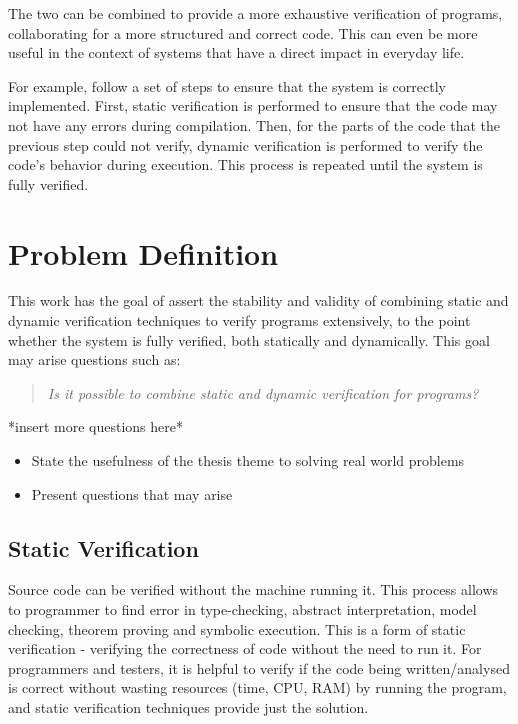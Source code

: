 The two can  be combined to provide a more exhaustive verification of \ocaml programs, 
collaborating for a more structured and correct code. This can even be more useful in the context of 
systems that have a direct impact in everyday life.

For example, \monitors follow a set of steps to ensure that the system is correctly implemented. 
First, static verification is performed to ensure that the code may not have any errors during compilation.
Then, for the parts of the code that the previous step could not verify, dynamic verification is performed 
to verify the code's behavior during execution. This process is repeated until the system is fully verified.

\section{Problem Definition}
\label{sec:problem_definition}

This work has the goal of assert the stability and validity of combining static and dynamic verification techniques 
to verify \ocaml programs extensively, to the point whether the system is fully verified, both statically and dynamically.
This goal may arise questions such as:

\begin{quote}
    \emph{Is it possible to combine static and dynamic verification for \ocaml programs?}
\end{quote}

*insert more questions here*


\begin{itemize}
    \item State the usefulness of the thesis theme to solving real world problems
    \item Present questions that may arise
\end{itemize}

\subsection{Static Verification}
\label{sub:static_verification}

Source code can be verified without the machine running it. This process allows to programmer 
to find error in type-checking, abstract interpretation, model checking, theorem proving and symbolic execution.
This is a form of static verification - verifying the correctness of code without the need to run it.
For programmers and testers, it is helpful to verify if the code being written/analysed is correct without 
wasting resources (time, CPU, RAM) by running the program, and static verification techniques provide just the solution.

